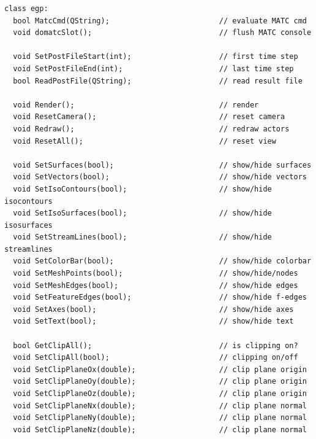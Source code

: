 \documentclass[a4paper,12pt]{article}
\begin{document}
\begin{footnotesize}
\begin{verbatim}
class egp:
  bool MatcCmd(QString);                         // evaluate MATC cmd
  void domatcSlot();                             // flush MATC console

  void SetPostFileStart(int);                    // first time step
  void SetPostFileEnd(int);                      // last time step
  bool ReadPostFile(QString);                    // read result file

  void Render();                                 // render
  void ResetCamera();                            // reset camera
  void Redraw();                                 // redraw actors
  void ResetAll();                               // reset view

  void SetSurfaces(bool);                        // show/hide surfaces
  void SetVectors(bool);                         // show/hide vectors
  void SetIsoContours(bool);                     // show/hide isocontours
  void SetIsoSurfaces(bool);                     // show/hide isosurfaces
  void SetStreamLines(bool);                     // show/hide streamlines
  void SetColorBar(bool);                        // show/hide colorbar
  void SetMeshPoints(bool);                      // show/hide/nodes
  void SetMeshEdges(bool);                       // show/hide edges
  void SetFeatureEdges(bool);                    // show/hide f-edges
  void SetAxes(bool);                            // show/hide axes
  void SetText(bool);                            // show/hide text

  bool GetClipAll();                             // is clipping on?
  void SetClipAll(bool);                         // clipping on/off
  void SetClipPlaneOx(double);                   // clip plane origin
  void SetClipPlaneOy(double);                   // clip plane origin
  void SetClipPlaneOz(double);                   // clip plane origin
  void SetClipPlaneNx(double);                   // clip plane normal
  void SetClipPlaneNy(double);                   // clip plane normal
  void SetClipPlaneNz(double);                   // clip plane normal


\end{verbatim}
\end{footnotesize}
\end{document}
